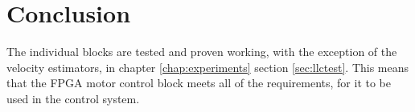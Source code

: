 \section{Conclusion}
The individual blocks are tested and proven working, with the exception of the velocity estimators, in chapter \ref{chap:experiments} section \ref{sec:llctest}. This means that the FPGA motor control block meets all of the requirements, for it to be used in the control system. 
